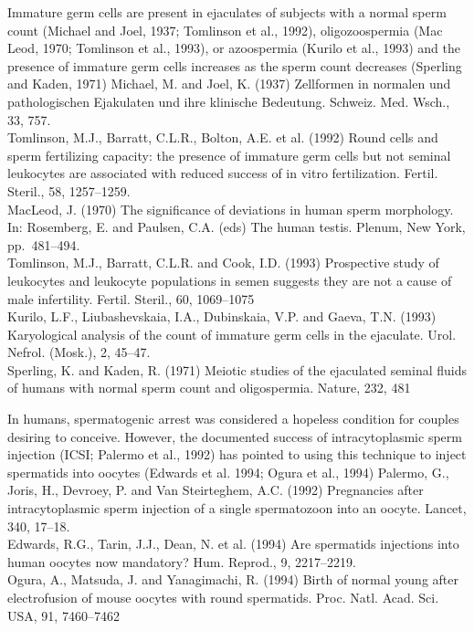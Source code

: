 \documentclass[12pt,twoside]{reedthesis}
\theoremstyle{definition}
\theoremstyle{definition}
\theoremstyle{remark}
\begin{document}
  Immature germ cells are present in ejaculates of subjects with a normal
  sperm count (Michael and Joel, 1937; Tomlinson et al., 1992),
  oligozoospermia (Mac Leod, 1970; Tomlinson et al., 1993), or azoospermia
  (Kurilo et al., 1993) and the presence of immature germ cells increases
  as the sperm count decreases (Sperling and Kaden, 1971) Michael, M. and
  Joel, K. (1937) Zellformen in normalen und pathologischen Ejakulaten und
  ihre klinische Bedeutung. Schweiz. Med. Wsch., 33, 757.\\
  Tomlinson, M.J., Barratt, C.L.R., Bolton, A.E. et al. (1992) Round cells
  and sperm fertilizing capacity: the presence of immature germ cells but
  not seminal leukocytes are associated with reduced success of in vitro
  fertilization. Fertil. Steril., 58, 1257--1259.\\
  MacLeod, J. (1970) The significance of deviations in human sperm
  morphology. In: Rosemberg, E. and Paulsen, C.A. (eds) The human testis.
  Plenum, New York, pp.~481--494.\\
  Tomlinson, M.J., Barratt, C.L.R. and Cook, I.D. (1993) Prospective study
  of leukocytes and leukocyte populations in semen suggests they are not a
  cause of male infertility. Fertil. Steril., 60, 1069--1075\\
  Kurilo, L.F., Liubashevskaia, I.A., Dubinskaia, V.P. and Gaeva, T.N.
  (1993) Karyological analysis of the count of immature germ cells in the
  ejaculate. Urol. Nefrol. (Mosk.), 2, 45--47.\\
  Sperling, K. and Kaden, R. (1971) Meiotic studies of the ejaculated
  seminal fluids of humans with normal sperm count and oligospermia.
  Nature, 232, 481
  
  In humans, spermatogenic arrest was considered a hopeless condition for
  couples desiring to conceive. However, the documented success of
  intracytoplasmic sperm injection (ICSI; Palermo et al., 1992) has
  pointed to using this technique to inject spermatids into oocytes
  (Edwards et al. 1994; Ogura et al., 1994) Palermo, G., Joris, H.,
  Devroey, P. and Van Steirteghem, A.C. (1992) Pregnancies after
  intracytoplasmic sperm injection of a single spermatozoon into an
  oocyte. Lancet, 340, 17--18.\\
  Edwards, R.G., Tarin, J.J., Dean, N. et al. (1994) Are spermatids
  injections into human oocytes now mandatory? Hum. Reprod., 9,
  2217--2219.\\
  Ogura, A., Matsuda, J. and Yanagimachi, R. (1994) Birth of normal young
  after electrofusion of mouse oocytes with round spermatids. Proc. Natl.
  Acad. Sci. USA, 91, 7460--7462
  
\end{document}
